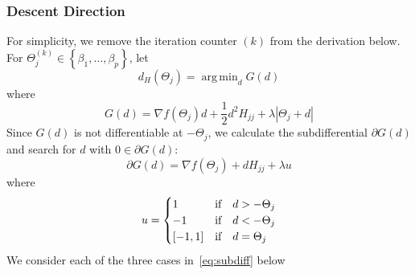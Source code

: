\documentclass[12pt,letter]{article}\usepackage[]{graphicx}\usepackage[]{color}
\newcommand{\tm}[1]{\textrm{{#1}}}
\DeclareMathOperator*{\argmin}{arg\,min}
\begin{document}
\subsubsection{Descent Direction}
For simplicity, we remove the iteration counter $(k)$ from the derivation below.\\ For \mbox{$\Theta_j^{(k)} \in \left\lbrace \beta_1, \ldots, \beta_p \right\rbrace$}, let
\begin{equation}
	d_{H}(\Theta_{j}) = \argmin_{d} G(d)  \label{eq:argminGd}
\end{equation}
where
\[ G(d) =  \nabla f(\Theta_{j}) d + \frac{1}{2} d^2 H_{j j} + \lambda |\Theta_{j} + d| \]
Since $G(d)$ is not differentiable at $-\Theta_j$, we calculate the subdifferential $\partial G(d)$ and search for $d$ with $0 \in \partial G(d)$:
\begin{equation}
	\partial G(d) = \nabla f(\Theta_{j}) + d H_{j j} + \lambda u   \label{eq:subdiff}
\end{equation}
where
\begin{equation}
	u = \begin{cases}
		1 & \tm{if\quad}d > -\Theta_j \\
		-1 & \tm{if\quad} d < -\Theta_j\\
		[-1,1] & \tm{if\quad} d = \Theta_j
	\end{cases}
\end{equation}
We consider each of the three cases in~\eqref{eq:subdiff} below
\end{document}
